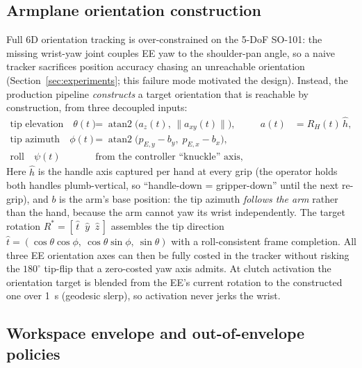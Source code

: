 \subsection{Armplane orientation construction}
\label{sec:armplane}

Full 6D orientation tracking is over-constrained on the 5-DoF SO-101: the
missing wrist-yaw joint couples EE yaw to the shoulder-pan angle, so a naive
tracker sacrifices position accuracy chasing an unreachable orientation
(Section~\ref{sec:experiments}; this failure mode motivated the design).
Instead, the production pipeline \emph{constructs} a target orientation that
is reachable by construction, from three decoupled inputs:
\begin{align}
  \text{tip elevation} \quad
  \theta(t) &= \operatorname{atan2}\!\bigl(a_z(t),\,\lVert a_{xy}(t)\rVert\bigr),
  & a(t) &= R_H(t)\,\hat h,
  \label{eq:elev}\\
  \text{tip azimuth} \quad
  \phi(t) &= \operatorname{atan2}\!\bigl(p_{E,y}-b_y,\;p_{E,x}-b_x\bigr),
  \label{eq:azim}\\
  \text{roll} \quad
  \psi(t) &\;\text{from the controller ``knuckle'' axis, orthogonalized
  against the tip.}
  \label{eq:roll}
\end{align}
Here \(\hat h\) is the handle axis captured per hand at every grip (the
operator holds both handles plumb-vertical, so ``handle-down =
gripper-down'' until the next re-grip), and \(b\) is the arm's base
position: the tip azimuth \emph{follows the arm} rather than the hand,
because the arm cannot yaw its wrist independently. The target rotation
\(R^\ast = [\,\hat t \;\; \hat y \;\; \hat z\,]\) assembles the tip
direction \(\hat t = (\cos\theta\cos\phi,\ \cos\theta\sin\phi,\
\sin\theta)\) with a roll-consistent frame completion. All three EE
orientation axes can then be fully costed in the tracker without risking
the \(180^\circ\) tip-flip that a zero-costed yaw axis admits. At clutch
activation the orientation target is blended from the EE's current rotation
to the constructed one over \SI{1}{s} (geodesic slerp), so activation never
jerks the wrist.

\subsection{Workspace envelope and out-of-envelope policies}
\label{sec:envelope}

